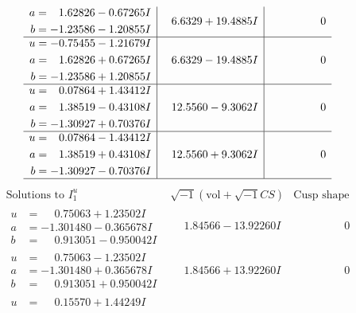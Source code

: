\documentclass[1p]{elsarticle_modified}
\theoremstyle{definition}
\newcommand{\I}{\sqrt{-1}}
\begin{document}
$$\begin{array}{c|c|c}
\begin{aligned}
a &= \phantom{-}1.62826 - 0.67265 I \\
b &= -1.23586 - 1.20855 I\end{aligned}
 & \phantom{-}6.6329 + 19.4885 I & \phantom{-0.000000 } 0 \\ \hline\begin{aligned}
u &= -0.75455 - 1.21679 I \\
a &= \phantom{-}1.62826 + 0.67265 I \\
b &= -1.23586 + 1.20855 I\end{aligned}
 & \phantom{-}6.6329 - 19.4885 I & \phantom{-0.000000 } 0 \\ \hline\begin{aligned}
u &= \phantom{-}0.07864 + 1.43412 I \\
a &= \phantom{-}1.38519 - 0.43108 I \\
b &= -1.30927 + 0.70376 I\end{aligned}
 & \phantom{-}12.5560 - 9.3062 I & \phantom{-0.000000 } 0 \\ \hline\begin{aligned}
u &= \phantom{-}0.07864 - 1.43412 I \\
a &= \phantom{-}1.38519 + 0.43108 I \\
b &= -1.30927 - 0.70376 I\end{aligned}
 & \phantom{-}12.5560 + 9.3062 I & \phantom{-0.000000 } 0\\
 \hline 
 \end{array}$$\newpage$$\begin{array}{c|c|c}  
\text{Solutions to }I^u_{1}& \I (\text{vol} + \sqrt{-1}CS) & \text{Cusp shape}\\
 \hline 
\begin{aligned}
u &= \phantom{-}0.75063 + 1.23502 I \\
a &= -1.301480 - 0.365678 I \\
b &= \phantom{-}0.913051 - 0.950042 I\end{aligned}
 & \phantom{-}1.84566 - 13.92260 I & \phantom{-0.000000 } 0 \\ \hline\begin{aligned}
u &= \phantom{-}0.75063 - 1.23502 I \\
a &= -1.301480 + 0.365678 I \\
b &= \phantom{-}0.913051 + 0.950042 I\end{aligned}
 & \phantom{-}1.84566 + 13.92260 I & \phantom{-0.000000 } 0 \\ \hline\begin{aligned}
u &= \phantom{-}0.15570 + 1.44249 I \\

\end{aligned}
\end{array}$$
\end{document}

